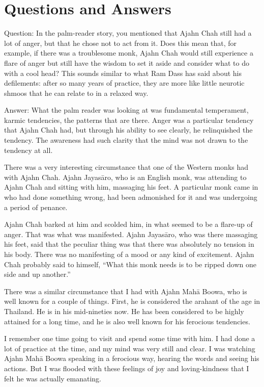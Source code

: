 \chapter{Questions and Answers}

\qaspace
Question: In the palm-reader story, you mentioned that Ajahn Chah still
had a lot of anger, but that he chose not to act from it. Does this mean
that, for example, if there was a troublesome monk, Ajahn Chah would
still experience a flare of anger but still have the wisdom to set it
aside and consider what to do with a cool head? This sounds similar to
what Ram Dass has said about his defilements: after so many years of
practice, they are more like little neurotic shmoos that he can relate
to in a relaxed way.

\qaspace
Answer: What the palm reader was looking at was fundamental temperament,
karmic tendencies, the patterns that are there. Anger was a particular
tendency that Ajahn Chah had, but through his ability to see clearly, he
relinquished the tendency. The awareness had such clarity that the mind
was not drawn to the tendency at all.

There was a very interesting circumstance that one of the Western monks
had with Ajahn Chah. Ajahn Jayasāro, who is an English monk, was
attending to Ajahn Chah and sitting with him, massaging his feet. A
particular monk came in who had done something wrong, had been
admonished for it and was undergoing a period of penance.

Ajahn Chah barked at him and scolded him, in what seemed to be a
flare-up of anger. That was what was manifested. Ajahn Jayasāro, who was
there massaging his feet, said that the peculiar thing was that there
was absolutely no tension in his body. There was no manifesting of a
mood or any kind of excitement. Ajahn Chah probably said to himself,
“What this monk needs is to be ripped down one side and up another.”

There was a similar circumstance that I had with Ajahn Mahā Boowa, who
is well known for a couple of things. First, he is considered the
arahant of the age in Thailand. He is in his mid-nineties now. He has
been considered to be highly attained for a long time, and he is also
well known for his ferocious tendencies.

I remember one time going to visit and spend some time with him. I had
done a lot of practice at the time, and my mind was very still and
clear. I was watching Ajahn Mahā Boowa speaking in a ferocious way,
hearing the words and seeing his actions. But I was flooded with these
feelings of joy and loving-kindness that I felt he was actually
emanating.

